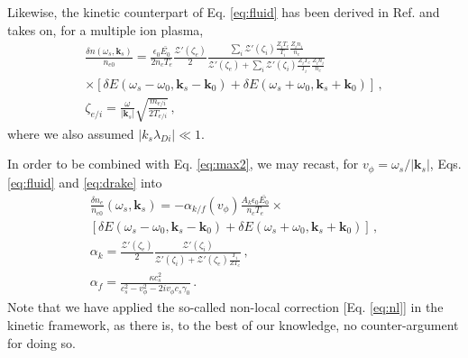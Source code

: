 \documentclass[
 reprint,
 amsmath,amssymb,
 aps,
]{revtex4-1}
\begin{document}
Likewise, the kinetic counterpart of Eq. \eqref{eq:fluid} has been derived in Ref. \cite[]{POF_Drake_1973} and    takes on, for a multiple ion plasma, 
\begin{align}
 \frac{ \delta n (\omega_s, \mathbf{k}_s ) }{n_{e0}}  =   \frac{ \epsilon_0  \bar{E_0} }{ 2n_c T_e } 
 \frac{\mathcal{Z}'( \zeta_e) }{2}
 \frac{\sum_i\mathcal{Z}'( \zeta_i)\frac{  Z_iT_e}{ T_i }\frac{  Z_in_i}{ n_e }   }{  \mathcal{Z}'( \zeta_e)+ \sum_i\mathcal{Z}'( \zeta_i)\frac{  Z_iT_e}{ T_i }\frac{ Z_i n_i}{ n_e }  }
\nonumber\\  \times \left[\delta E(\omega_s-\omega_0, \mathbf{k}_s-\mathbf{k}_0) +\delta E(\omega_s+\omega_0, \mathbf{k}_s+\mathbf{k}_0) \right] %
   \, ,\label{eq:drake}\\
   \zeta_{e/i} = \frac{   \omega }{   \vert\mathbf{k}_s\vert }  \sqrt{ \frac{ m_{e/i } }{ 2T_{e/i }}  }  \label{eq:xi} \, , 
 \end{align}
 where we also assumed $\vert k_s \lambda_{Di} \vert \ll 1$. 

In order to be combined with Eq. \eqref{eq:max2}, we may recast, for $v_\phi = \omega_s/\vert \mathbf{k}_s\vert $, Eqs. \eqref{eq:fluid} and  \eqref{eq:drake} into 
\begin{align}
   \frac{\delta n_e }{n_{e0}}(\omega_s,\mathbf{k}_s) = -\alpha_{k/f}(v_\phi) \frac{A_k\epsilon_0 \bar{E_0}}{n_c T_e}\times \nonumber\\ \left[\delta E(\omega_s-\omega_0, \mathbf{k}_s-\mathbf{k}_0) +\delta E(\omega_s+\omega_0, \mathbf{k}_s+\mathbf{k}_0) \right] \, ,\label{eq:fd} \\
   \alpha_k  = \frac{\mathcal{Z}'( \zeta_e) }{2}\frac{\mathcal{Z}'( \zeta_i)   }{  \mathcal{Z}'( \zeta_i) +\mathcal{Z}'( \zeta_e)\frac{ T_i }{  ZT_e} }\, ,\label{eq:alphak} \\
   \alpha_f = \frac{\kappa c_s^2}{ c_s^2-v_\phi^2 -2iv_\phi c_s \gamma_0}\, .\label{eq:alphaf}
\end{align}
Note that we have  applied the so-called non-local correction [Eq. \eqref{eq:nl}] in the kinetic framework, as there is, to the best of our knowledge,  no counter-argument for doing so. 
\end{document}

